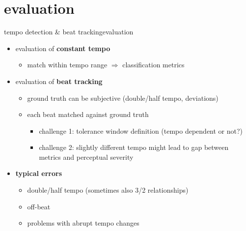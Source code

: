     \section[eval]{evaluation}
        \begin{frame}{tempo detection \& beat tracking}{evaluation}
            
            \begin{itemize}
                \item   evaluation of \textbf{constant tempo }
                    \begin{itemize}
                        \item   match within tempo range $\Rightarrow$ classification metrics
                    \end{itemize}
                \smallskip
                \item<2->   evaluation of \textbf{beat tracking }
                    \begin{itemize}
                        \item   ground truth can be subjective (double/half tempo, deviations)
                        \item   each beat matched against ground truth 
                            \begin{itemize}
                                \item   challenge 1: tolerance window definition (tempo dependent or not?)
                                \item   challenge 2: slightly different tempo might lead to gap between metrics and perceptual severity
                            \end{itemize}
                    \end{itemize}
                \smallskip
                \item<3->   \textbf{typical errors}
                    \begin{itemize}
                        \item   double/half tempo (sometimes also 3/2 relationships)
                        \item   off-beat
                        \item   problems with abrupt tempo changes
                    \end{itemize}
            \end{itemize}
        \end{frame}
    
